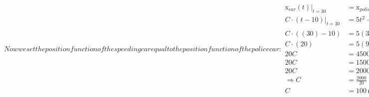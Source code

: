 \documentclass{article}
\newcommand{\x}{\mathrm{x}}
\begin{document}
\begin{subequations}
	Now we set the position function of the speeding car equal to the position function of the police car:
	\begin{align}
		\x_{car}(t) \biggr\rvert_{t=30} &= \x_{police}(t) \biggr\rvert_{t=30} \\
		C\cdot(t-10) \biggr\rvert_{t=30} &= 5t^2-100t+500 \biggr\rvert_{t=30} \\
		C\cdot((30)-10) &= 5(30)^2-100(30)+500 \\
		C\cdot(20) &= 5(900)-3000+500 \\
		20C &= 4500-3000+500 \\
		20C &= 1500+500 \\
		20C &= 2000 \\
		\Rightarrow C &= \frac{2000}{20} \\
		C &= 100 \,\mathrm{m/s}
	\end{align}
	\end{subequations}
\end{document}
